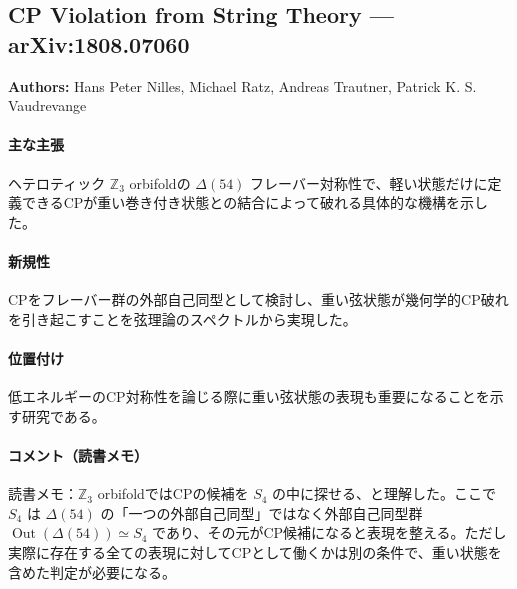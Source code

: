 \subsection{CP Violation from String Theory --- arXiv:1808.07060}

\textbf{Authors:} Hans Peter Nilles, Michael Ratz, Andreas Trautner, Patrick K. S. Vaudrevange

\paragraph{主な主張}
ヘテロティック $\mathbb{Z}_3$ orbifoldの $\Delta(54)$ フレーバー対称性で、軽い状態だけに定義できるCPが重い巻き付き状態との結合によって破れる具体的な機構を示した\cite{Nilles:2018wex}。

\paragraph{新規性}
CPをフレーバー群の外部自己同型として検討し、重い弦状態が幾何学的CP破れを引き起こすことを弦理論のスペクトルから実現した。

\paragraph{位置付け}
低エネルギーのCP対称性を論じる際に重い弦状態の表現も重要になることを示す研究である。

\paragraph{コメント（読書メモ）}
読書メモ：$\mathbb{Z}_3$ orbifoldではCPの候補を $S_4$ の中に探せる、と理解した。ここで $S_4$ は $\Delta(54)$ の「一つの外部自己同型」ではなく外部自己同型群 $\operatorname{Out}(\Delta(54))\simeq S_4$ であり、その元がCP候補になると表現を整える。ただし実際に存在する全ての表現に対してCPとして働くかは別の条件で、重い状態を含めた判定が必要になる。
